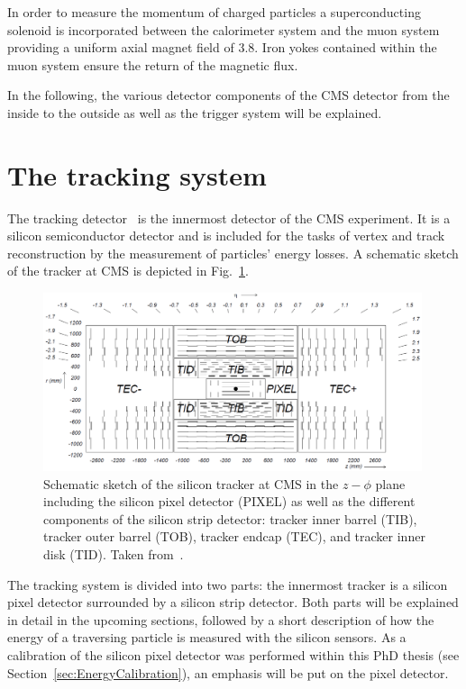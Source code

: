 In order to measure the momentum of charged particles a superconducting solenoid is incorporated between the calorimeter system and the muon system providing a uniform axial magnet field of 3.8\tesla.
Iron yokes contained within the muon system ensure the return of the magnetic flux. 

In the following, the various detector components of the CMS detector from the inside to the outside as well as the trigger system will be explained.
\FloatBarrier
\section{The tracking system}
The tracking detector~\cite{bib:CMS:Tracker_1997,bib:CMS:Tracker_2000} is the innermost detector of the CMS experiment. 
It is a silicon semiconductor detector and is included for the tasks of vertex and track reconstruction by the measurement of particles' energy losses.
A schematic sketch of the tracker at CMS is depicted in Fig.~\ref{fig:Tracker}.
\begin{figure}[!b]
  \centering
      \includegraphics[width=0.99\textwidth]{figures/experiment/CMS/Figures_Experimental_Apparatus_Tracker.png}
  \caption{Schematic sketch of the silicon tracker at CMS in the $z - \phi$ plane including the silicon pixel detector (PIXEL) as well as the different components of the silicon strip detector: tracker inner barrel (TIB), tracker outer barrel (TOB), tracker endcap (TEC), and tracker inner disk (TID). Taken from~\cite{bib:CMS:tracking_8TeV}.
           }  
  \label{fig:Tracker}
\end{figure}
The tracking system is divided into two parts: the innermost tracker is a silicon pixel detector surrounded by a silicon strip detector.
Both parts will be explained in detail in the upcoming sections, followed by a short description of how the energy of a traversing particle is measured with the silicon sensors.
As a calibration of the silicon pixel detector was performed within this PhD thesis (see Section~\ref{sec:EnergyCalibration}), an emphasis will be put on the pixel detector.


